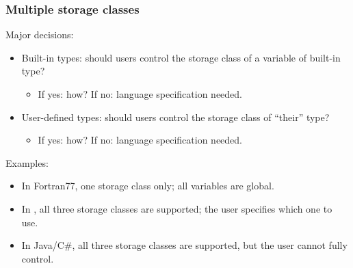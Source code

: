 \documentclass{beamer}
\begin{document}
\begin{frame}
\frametitle{Multiple storage classes} 
Major decisions:
\begin{itemize}

\item Built-in types: should users control the storage class of a
variable of built-in type?
\begin{itemize}
\item If yes: how? If no: language specification needed.
\end{itemize}

\item User-defined types: should users control the storage class of 
``their'' type?
\begin{itemize}
\item If yes: how? If no: language specification needed.
\end{itemize}

\end{itemize}

Examples:
\begin{itemize}
\item In Fortran77, one storage class only; all variables are global.
\item 
In \Cpp, all three storage classes are supported; the user
specifies which one to use. 
\item In Java/C\#, all three storage classes are supported, but the
user cannot fully control. 
\end{itemize}
\end{frame}
\end{document}
